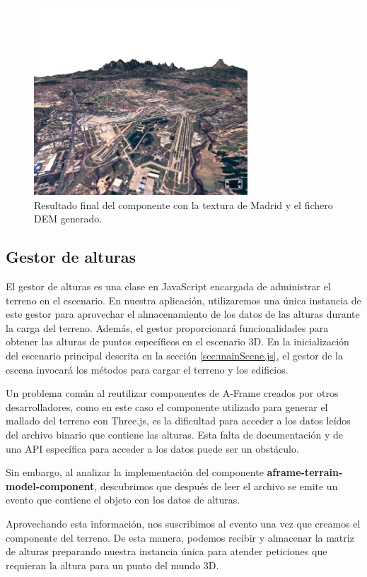 \documentclass[a4paper, 11pt]{book}
\begin{document}
\begin{figure}[h]
  \centering
  \includegraphics[width=8cm, keepaspectratio]{img/madrid_terrain.jpg}
  \caption{Resultado final del componente con la textura de Madrid y el fichero DEM generado.}
  \label{fig:demAframe}
\end{figure}

\subsection{Gestor de alturas}
\label{subsec:heightManager}
El gestor de alturas es una clase en JavaScript encargada de administrar el terreno en el escenario. En nuestra aplicación, utilizaremos una única instancia de este gestor para aprovechar el almacenamiento de los datos de las alturas durante la carga del terreno. Además, el gestor proporcionará funcionalidades para obtener las alturas de puntos específicos en el escenario 3D. En la inicialización del escenario principal descrita en la sección \ref{sec:mainScene.js}, el gestor de la escena invocará los métodos para cargar el terreno y los edificios.

Un problema común al reutilizar componentes de A-Frame creados por otros desarrolladores, como en este caso el componente utilizado para generar el mallado del terreno con Three.js, es la dificultad para acceder a los datos leídos del archivo binario que contiene las alturas. Esta falta de documentación y de una API específica para acceder a los datos puede ser un obstáculo.

Sin embargo, al analizar la implementación del componente\textbf{ aframe-terrain-model-component}, descubrimos que después de leer el archivo se emite un evento que contiene el objeto con los datos de alturas.

Aprovechando esta información, nos suscribimos al evento una vez que creamos el componente del terreno. De esta manera, podemos recibir y almacenar la matriz de alturas preparando nuestra instancia única para atender peticiones que requieran la altura para un punto del mundo 3D.
\end{document}
